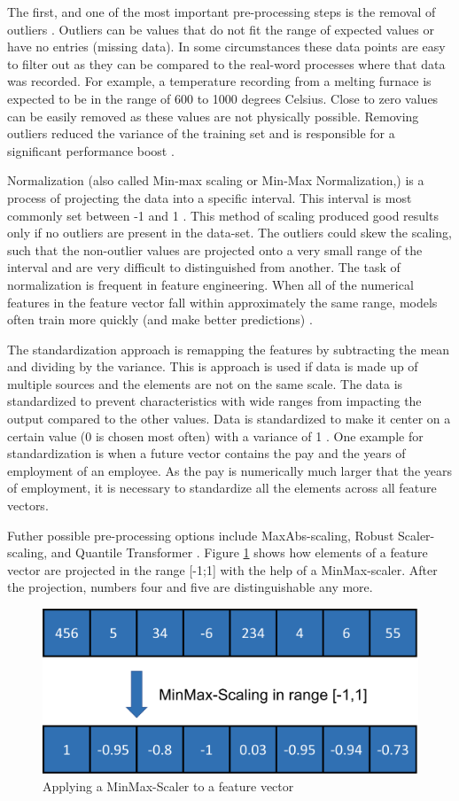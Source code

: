 The first, and one of the most important pre-processing steps is the removal of outliers \cite{Yang}. Outliers can be values that do not fit the range of expected values or have no entries (missing data). In some circumstances these data points are easy to filter out as they can be compared to the real-word processes where that data was recorded. For example, a temperature recording from a melting furnace is expected to be in the range of 600 to 1000 degrees Celsius. Close to zero values can be easily removed as these values are not physically possible. Removing outliers reduced the variance of the training set and is responsible for a significant performance boost \cite{Li}.

Normalization (also called Min-max scaling or Min-Max Normalization,) is a process of projecting the data into a specific interval. This interval is most commonly set between -1 and 1 \cite{Peshawa}. This method of scaling produced good results only if no outliers are present in the data-set. The outliers could skew the scaling, such that the non-outlier values are projected onto a very small range of the interval and are very difficult to distinguished from another. The task of normalization is frequent in feature engineering. When all of the numerical features in the feature vector fall within approximately the same range, models often train more quickly (and make better predictions) \cite{Jayalakshmi}.

The standardization approach is remapping the features by subtracting the mean and dividing by the variance. This is approach is used if data is made up of multiple sources and the elements are not on the same scale. The data is standardized to prevent characteristics with wide ranges from impacting the output compared to the other values. Data is standardized to make it center on a certain value (0 is chosen most often) with a variance of 1 \cite{Raju}.
One example for standardization is when a future vector contains the pay and the years of employment of an employee. As the pay is numerically much larger that the years of employment, it is necessary to standardize all the elements across all feature vectors. 

Futher possible pre-processing options include MaxAbs-scaling, Robust Scaler-scaling, and Quantile Transformer \cite{Ahsan}.
Figure \ref{fig:MM} shows how elements of a feature vector are projected in the range [-1;1] with the help of a MinMax-scaler. After the projection, numbers four and five are distinguishable any more. 
\begin{figure}[H]
	\centering
	\includegraphics[width=0.5\linewidth]{IMGs/MM.png}
	\caption{Applying a MinMax-Scaler to a feature vector}
	\label{fig:MM}
\end{figure}


